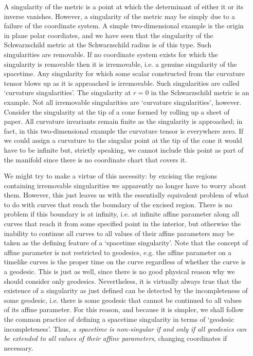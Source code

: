 A singularity of the metric is a point at which the determinant of either it or
its inverse vanishes. However, a singularity of the metric may be simply due
to a failure of the coordinate system. A simple two-dimensional example is the
origin in plane polar coordiates, and we have seen that the singularity of
the Schwarzschild metric at the Schwarzschild radius is of this type. Such
singularities are removable. If no coordinate system exists for which the
singularity is removable then it is irremovable, i.e. a genuine singularity of
the spacetime. Any singularity for which some scalar constructed from the
curvature tensor blows up as it is approached is irremovable. Such singularities
are called `curvature singularities'. The singularity at $r=0$ in the
Schwarzschild metric is an example. Not all irremovable singularities are
`curvature singularities', however. Consider the singularity at the tip of a
cone formed by rolling up a sheet of paper. All curvature invariants remain
finite as the singularity is approached; in fact, in this two-dimensional
example the curvature tensor is everywhere zero. If we could assign a curvature
to the singular point at the tip of the cone it would have to be infinite but,
strictly speaking, we cannot include this point as part of the manifold since
there is no coordinate chart that covers it. 

We might try to make a virtue of this necessity: by excising the regions
containing irremovable singularities we apparently no longer have to worry about
them. However, this just leaves us with the essentially equivalent problem of
what to do with curves that reach the boundary of the excised region. There is
no problem if this boundary is at infinity, i.e. at infinite affine parameter
along all curves that reach it from some specified point in the interior, but
otherwise the inability to continue all curves to all values of their affine
parameters may be taken as the defining feature of a `spacetime singularity'.
Note that the concept of affine parameter is not restricted to geodesics, e.g.
the affine parameter on a timelike curves is the proper time on the curve
regardless of whether the curve is a geodesic. This is just as well, since there
is no good physical reason why we should consider only geodesics. Nevertheless,
it is virtually always true that the existence of a singularity as just
defined can be detected by the incompleteness of some geodesic, i.e. there is
some geodesic that cannot be continued to all values of its affine parameter.
For this reason, and because it is simpler, we shall follow the common practice
of defining a spacetime singularity in terms of `geodesic incompleteness'.
Thus, {\it a spacetime is non-singular if and only if all geodesics can be
extended to all values of their affine parameters}, changing coordinates if
necessary. 

